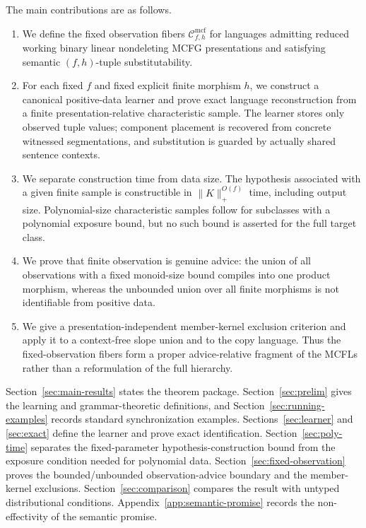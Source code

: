 \documentclass[11pt,a4paper]{article}
\theoremstyle{remark}
\newcommand{\Cmcf}[2]{\mathcal{C}^{\mathrm{mcf}}_{#1,#2}}
\begin{document}
The main contributions are as follows.
\begin{enumerate}[label=(\roman*),leftmargin=*]
\item We define the fixed observation fibers \(\Cmcf{f}{h}\) for languages
admitting reduced working binary linear nondeleting MCFG presentations and
satisfying semantic \((f,h)\)-tuple substitutability.

\item For each fixed \(f\) and fixed explicit finite morphism \(h\), we construct
a canonical positive-data learner and prove exact language reconstruction from
a finite presentation-relative characteristic sample.  The learner stores only
observed tuple values; component placement is recovered from concrete witnessed
segmentations, and substitution is guarded by actually shared sentence
contexts.

\item We separate construction time from data size.  The hypothesis associated
with a given finite sample is constructible in \(\|K\|_+^{O(f)}\) time,
including output size.  Polynomial-size characteristic samples follow for
subclasses with a polynomial exposure bound, but no such bound is asserted for
the full target class.

\item We prove that finite observation is genuine advice: the union of all
observations with a fixed monoid-size bound compiles into one product morphism,
whereas the unbounded union over all finite morphisms is not identifiable from
positive data.

\item We give a presentation-independent member-kernel exclusion criterion and
apply it to a context-free slope union and to the copy language.  Thus the
fixed-observation fibers form a proper advice-relative fragment of the MCFLs
rather than a reformulation of the full hierarchy.
\end{enumerate}

Section~\ref{sec:main-results} states the theorem package.
Section~\ref{sec:prelim} gives the learning and grammar-theoretic definitions,
and Section~\ref{sec:running-examples} records standard synchronization
examples.  Sections~\ref{sec:learner} and \ref{sec:exact} define the learner
and prove exact identification.  Section~\ref{sec:poly-time} separates the
fixed-parameter hypothesis-construction bound from the exposure condition
needed for polynomial data.  Section~\ref{sec:fixed-observation} proves the
bounded/unbounded observation-advice boundary and the member-kernel exclusions.
Section~\ref{sec:comparison} compares the result with untyped distributional
conditions.  Appendix~\ref{app:semantic-promise} records the non-effectivity of
the semantic promise.
\end{document}
